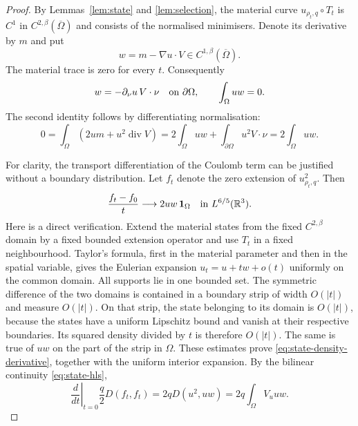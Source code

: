 \documentclass[11pt,a4paper]{article}
\theoremstyle{definition}
\theoremstyle{remark}
\begin{document}
\begin{proof}
By Lemmas~\ref{lem:state} and \ref{lem:selection}, the material curve
$u_{\rho_t,q}\circ T_t$ is $C^1$ in
$C^{2,\beta}(\overline\Omega)$ and consists of the normalised
minimisers.  Denote its derivative by $m$ and put
\[
 w=m-\nabla u\cdot V\in C^{1,\beta}(\overline\Omega).
\]
The material trace is zero for every $t$.  Consequently
\begin{equation}
 w=-\partial_\nu u\,V\cdot\nu\quad\hbox{on }\partial\Omega,
 \qquad \int_\Omega uw=0.
 \label{eq:state-shape-normalisation}
\end{equation}
The second identity follows by differentiating normalisation:
\[
 0=\int_\Omega(2um+u^2\operatorname{div}V)
   =2\int_\Omega uw+\int_{\partial\Omega}u^2V\cdot\nu
   =2\int_\Omega uw.
\]

For clarity, the transport differentiation of the Coulomb term can
be justified without a boundary distribution.  Let $f_t$ denote
the zero extension of $u_{\rho_t,q}^2$.  Then
\begin{equation}
 \frac{f_t-f_0}{t}\longrightarrow 2uw\,\mathbf1_\Omega
       \quad\hbox{in }L^{6/5}(\mathbb R^3).
 \label{eq:state-density-derivative}
\end{equation}
Here is a direct verification.  Extend the material states from the
fixed $C^{2,\beta}$ domain by a fixed bounded extension operator and
use $T_t$ in a fixed neighbourhood.  Taylor's formula, first in the
material parameter and then in the spatial variable, gives the
Eulerian expansion $u_t=u+tw+o(t)$ uniformly on the common domain.
All supports lie in one bounded set.  The symmetric difference of
the two domains is contained in a boundary strip of width $O(|t|)$
and measure $O(|t|)$.  On that strip, the state belonging to its
domain is $O(|t|)$, because the states have a uniform Lipschitz bound
and vanish at their respective boundaries.  Its squared density
divided by $t$ is therefore $O(|t|)$.  The same is true of $uw$ on
the part of the strip in $\Omega$.  These estimates prove
\eqref{eq:state-density-derivative}, together with the uniform
interior expansion.  By the bilinear continuity
\eqref{eq:state-hls},
\begin{equation}
 \left.\frac{d}{dt}\right|_{t=0}\frac q2D(f_t,f_t)
                =2qD(u^2,uw)=2q\int_\Omega V_uuw.
 \label{eq:state-hartree-variation}
\end{equation}


\end{proof}
\end{document}

